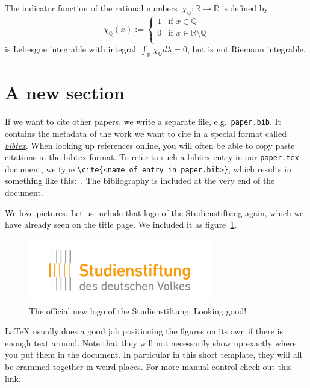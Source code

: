 \documentclass[12pt, a4paper]{article}
\begin{document}
The indicator function of the rational numbers~$\chi_{\mathbb{Q}}: \mathbb{R} \to
\mathbb{R}$ is defined by
\begin{equation}\label{indicator}
  \chi_{\mathbb{Q}}(x) :=
  \begin{cases}
    1 &\text{if } x \in \mathbb{Q} \\
    0 &\text{if } x \in \mathbb{R} \setminus \mathbb{Q} \\
  \end{cases}
\end{equation}
is Lebesgue integrable with integral~$\int_{\mathbb{R}} \chi_{\mathbb{Q}}
d\lambda = 0$, but is not Riemann integrable.

\section{A new section}\label{sec:new}

If we want to cite other papers, we write a separate file,
e.g.~\texttt{paper.bib}. It contains the metadata of the work we want to cite in
a special format called
\href{https://en.wikipedia.org/wiki/BibTeX}{\emph{bibtex}}. When looking up
references online, you will often be able to copy paste citations in the bibtex
format. To refer to such a bibtex entry in our \texttt{paper.tex} document, we
type
\texttt{\textbackslash{}cite\{<name of entry in paper.bib>\}}, which results
in something like this:~\cite{idatacool}. The bibliography is included at the
very end of the document.

We love pictures. Let us include that logo of the Studienstiftung again, which
we have already seen on the title page. We included it as
figure~\ref{fig:logosdv}.
\begin{figure}
  \begin{center}
    \includegraphics[width=8cm]{logo_sdv.pdf}
  \end{center}
  \caption{The official new logo of the Studienstiftung. Looking good!
  \label{fig:logosdv}}
\end{figure}
\LaTeX{} usually does a good job positioning the figures on its own if there is
enough text around. Note that they will not necessarily show up exactly where
you put them in the document. In particular in this short template, they will
all be crammed together in weird places. For more manual control check out
\href{https://en.wikibooks.org/wiki/LaTeX/Floats,_Figures_and_Captions}{this
link}.
\end{document}
